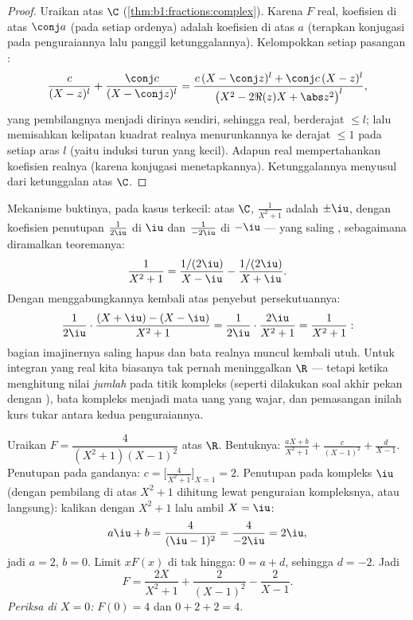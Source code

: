 \begin{proof}
Uraikan atas $\C$ (\cref{thm:b1:fractions:complex}). Karena $F$
real, koefisien di atas  $\conj a$ (pada setiap ordenya) adalah
 koefisien di atas $a$ (terapkan konjugasi pada
penguraiannya lalu panggil ketunggalannya). Kelompokkan setiap pasangan :
\[
\frac{c}{(X - z)^l} + \frac{\conj c}{(X - \conj z)^l}
= \frac{c\,(X - \conj z)^l + \conj c\,(X - z)^l}{\bigl(X^2 - 2\Re(z)X
+ \abs z^2\bigr)^{l}},
\]
yang pembilangnya menjadi  dirinya sendiri, sehingga real, berderajat $\leq l$;
lalu memisahkan kelipatan kuadrat realnya menurunkannya ke derajat
$\leq 1$ pada setiap aras $l$ (yaitu induksi turun yang kecil). Adapun  real
mempertahankan koefisien realnya (karena konjugasi menetapkannya). Ketunggalannya
menyusul dari ketunggalan atas $\C$.
\end{proof}

\begin{example}\label{ex:b1:fractions:pairing}
Mekanisme buktinya, pada kasus terkecil: atas $\C$, 
$\frac1{X^2+1}$ adalah $\pm\iu$, dengan koefisien penutupan
$\frac1{2\iu}$ di $\iu$ dan $\frac1{-2\iu}$ di $-\iu$ ---
yang saling , sebagaimana diramalkan teoremanya:
\[
\frac{1}{X^2 + 1}
= \frac{1/(2\iu)}{X - \iu} - \frac{1/(2\iu)}{X + \iu} .
\]
Dengan menggabungkannya kembali atas penyebut persekutuannya:
\[
\frac{1}{2\iu}\cdot\frac{(X + \iu) - (X - \iu)}{X^2 + 1}
= \frac{1}{2\iu}\cdot\frac{2\iu}{X^2 + 1} = \frac{1}{X^2+1} :
\]
bagian imajinernya saling hapus dan bata realnya muncul kembali utuh.
Untuk integran yang real kita biasanya tak pernah meninggalkan $\R$ --- tetapi ketika
menghitung nilai \emph{jumlah} pada titik kompleks (seperti dilakukan soal akhir
pekan dengan ), bata kompleks menjadi mata uang yang
wajar, dan pemasangan inilah kurs tukar antara kedua
penguraiannya.
\end{example}

\begin{example}\label{ex:b1:fractions:real}
Uraikan $F = \dfrac{4}{(X^2+1)(X-1)^2}$ atas $\R$. Bentuknya:
$\frac{aX + b}{X^2 + 1} + \frac{c}{(X-1)^2} + \frac{d}{X - 1}$.
Penutupan pada  gandanya: $c = \bigl[\frac{4}{X^2+1}\bigr]_{X=1} =
2$. Penutupan pada  kompleks $\iu$ (dengan pembilang di atas $X^2 + 1$
dihitung lewat penguraian kompleksnya, atau langsung): kalikan dengan
$X^2 + 1$ lalu ambil $X = \iu$:
\[
a\iu + b = \frac{4}{(\iu - 1)^2} = \frac{4}{-2\iu} = 2\iu ,
\]
jadi $a = 2$, $b = 0$. Limit $xF(x)$ di tak hingga: $0 = a + d$, sehingga $d
= -2$. Jadi
\[
F = \frac{2X}{X^2+1} + \frac{2}{(X-1)^2} - \frac{2}{X-1} .
\]
\emph{Periksa di $X = 0$:} $F(0) = 4$ dan $0 + 2 + 2 = 4$.
\end{example}

